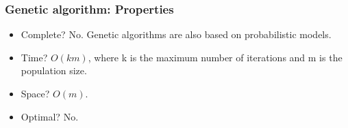 \documentclass{beamer}
\begin{document}
    \begin{frame}
    \frametitle{Genetic algorithm: Properties}
     \begin{itemize}
         \item Complete? \pause No.
         \pause         
         Genetic algorithms are also based on probabilistic models.
         \pause
         \item Time? \pause 
         \begin{math}O(km)\end{math}, where k is the maximum number of iterations and m is the population size.
         \pause
         \item Space? \pause
         \begin{math}O(m).\end{math}
         \pause
         \item Optimal? \pause No.
     \end{itemize}   
    \end{frame}
\end{document}

